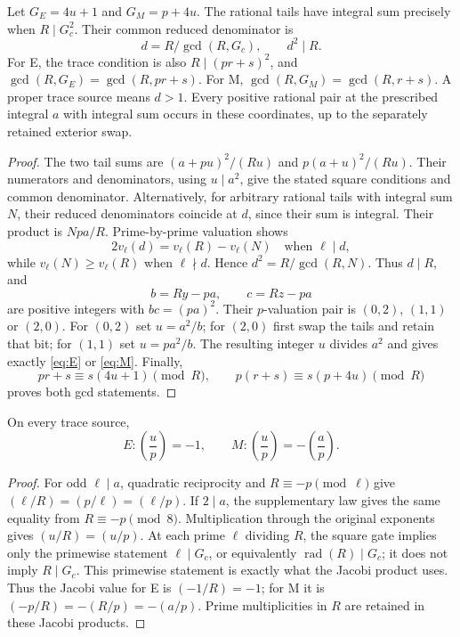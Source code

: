 \begin{lemma}\label{lem:trace}
Let $G_E=4u+1$ and $G_M=p+4u$. The rational tails have integral sum precisely
when $R\mid G_c^2$. Their common reduced denominator is
\[
 d=R/\gcd(R,G_c),\qquad d^2\mid R.
\]
For E, the trace condition is also $R\mid(pr+s)^2$, and
$\gcd(R,G_E)=\gcd(R,pr+s)$. For M,
\(\gcd(R,G_M)=\gcd(R,r+s)\). A proper trace source means $d>1$.
Every positive rational pair at the prescribed integral $a$ with integral
sum occurs in these coordinates, up to the separately retained exterior swap.
\end{lemma}
\begin{proof}
The two tail sums are $(a+pu)^2/(Ru)$ and $p(a+u)^2/(Ru)$.
Their numerators and denominators, using $u\mid a^2$, give the stated square
conditions and common denominator. Alternatively, for arbitrary rational tails
with integral sum $N$, their reduced denominators coincide at $d$, since their
sum is integral. Their product is $Npa/R$. Prime-by-prime valuation shows
\[
 2v_\ell(d)=v_\ell(R)-v_\ell(N)\quad\text{when }\ell\mid d,
\]
while \(v_\ell(N)\ge v_\ell(R)\) when \(\ell\nmid d\). Hence
$d^2=R/\gcd(R,N)$. Thus $d\mid R$, and
\[
 b=Ry-pa,\qquad c=Rz-pa
\]
are positive integers with $bc=(pa)^2$. Their $p$-valuation pair is $(0,2)$,
$(1,1)$ or $(2,0)$. For $(0,2)$ set $u=a^2/b$; for $(2,0)$ first swap the
tails and retain that bit; for $(1,1)$ set $u=pa^2/b$. The resulting integer
$u$ divides $a^2$ and gives exactly \eqref{eq:E} or \eqref{eq:M}.
Finally,
\[
 pr+s\equiv s(4u+1)\pmod R,\qquad
 p(r+s)\equiv s(p+4u)\pmod R
\]
proves both gcd statements.
\end{proof}

\begin{lemma}\label{lem:char}
On every trace source,
\[
 E:\left(\frac up\right)=-1,\qquad
 M:\left(\frac up\right)=-\left(\frac ap\right).
\]
\end{lemma}
\begin{proof}
For odd $\ell\mid a$, quadratic reciprocity and $R\equiv-p\pmod\ell$ give
$(\ell/R)=(p/\ell)=(\ell/p)$. If $2\mid a$, the supplementary law gives the
same equality from $R\equiv-p\pmod8$. Multiplication through the original
exponents gives $(u/R)=(u/p)$. At each prime \(\ell\) dividing \(R\), the
square gate implies only the primewise statement \(\ell\mid G_c\), or
equivalently \(\operatorname{rad}(R)\mid G_c\); it does not imply
\(R\mid G_c\). This primewise statement is exactly what the Jacobi product
uses. Thus the Jacobi value for E is $(-1/R)=-1$;
for M it is $(-p/R)=-(R/p)=-(a/p)$. Prime multiplicities in $R$ are retained
in these Jacobi products.
\end{proof}

